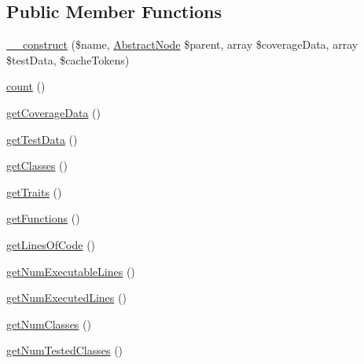 \subsection*{Public Member Functions}
\begin{DoxyCompactItemize}
\item 
\mbox{\hyperlink{class_sebastian_bergmann_1_1_code_coverage_1_1_node_1_1_file_a6788f327c6adbd76dc34039425ab4e15}{\+\_\+\+\_\+construct}} (\$name, \mbox{\hyperlink{class_sebastian_bergmann_1_1_code_coverage_1_1_node_1_1_abstract_node}{Abstract\+Node}} \$parent, array \$coverage\+Data, array \$test\+Data, \$cache\+Tokens)
\item 
\mbox{\hyperlink{class_sebastian_bergmann_1_1_code_coverage_1_1_node_1_1_file_ac751e87b3d4c4bf2feb03bee8b092755}{count}} ()
\item 
\mbox{\hyperlink{class_sebastian_bergmann_1_1_code_coverage_1_1_node_1_1_file_a778e636a4824655949fe89487f5220c3}{get\+Coverage\+Data}} ()
\item 
\mbox{\hyperlink{class_sebastian_bergmann_1_1_code_coverage_1_1_node_1_1_file_ac37661c5300d5ff713bfc2cb0d4c6814}{get\+Test\+Data}} ()
\item 
\mbox{\hyperlink{class_sebastian_bergmann_1_1_code_coverage_1_1_node_1_1_file_aaab663f8e00e05d4f6853d580e231e14}{get\+Classes}} ()
\item 
\mbox{\hyperlink{class_sebastian_bergmann_1_1_code_coverage_1_1_node_1_1_file_a8985442e8133cd567bf7ce548f96561f}{get\+Traits}} ()
\item 
\mbox{\hyperlink{class_sebastian_bergmann_1_1_code_coverage_1_1_node_1_1_file_a131c2522f07821f77cd1d038c216031b}{get\+Functions}} ()
\item 
\mbox{\hyperlink{class_sebastian_bergmann_1_1_code_coverage_1_1_node_1_1_file_a078d4af993fd559bc026b82d6d324ca3}{get\+Lines\+Of\+Code}} ()
\item 
\mbox{\hyperlink{class_sebastian_bergmann_1_1_code_coverage_1_1_node_1_1_file_a70a600ff3ef3002740ad1ce48814bee1}{get\+Num\+Executable\+Lines}} ()
\item 
\mbox{\hyperlink{class_sebastian_bergmann_1_1_code_coverage_1_1_node_1_1_file_acfa55061fa6bf0b24060b1fb9f23df6c}{get\+Num\+Executed\+Lines}} ()
\item 
\mbox{\hyperlink{class_sebastian_bergmann_1_1_code_coverage_1_1_node_1_1_file_acf97fce0343831a33e60ef9c674c4f94}{get\+Num\+Classes}} ()
\item 
\mbox{\hyperlink{class_sebastian_bergmann_1_1_code_coverage_1_1_node_1_1_file_a1ca8b300e7accd8d285719e26a920349}{get\+Num\+Tested\+Classes}} ()

\end{DoxyCompactItemize}
